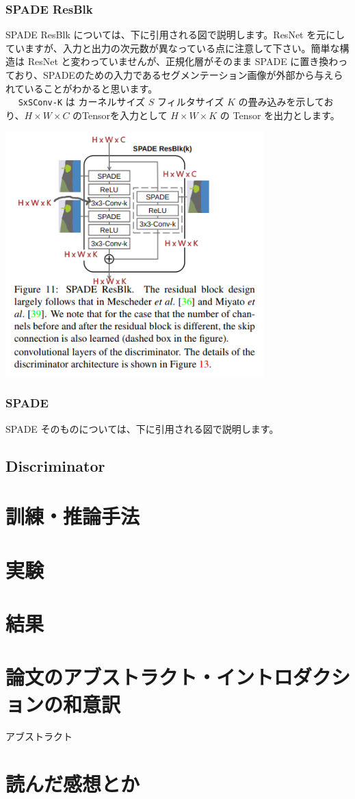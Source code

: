 \documentclass[a4paper, dvipdfmx, 10pt]{article}
\begin{document}
\subsubsection{SPADE ResBlk}
\label{sec:orgc088769}
SPADE ResBlk については、下に引用される図で説明します。ResNet を元にしていますが、入力と出力の次元数が異なっている点に注意して下さい。簡単な構造は ResNet と変わっていませんが、正規化層がそのまま SPADE に置き換わっており、SPADEのための入力であるセグメンテーション画像が外部から与えられていることがわかると思います。\\
 　 \texttt{SxSConv-K} は カーネルサイズ \(S\) フィルタサイズ \(K\) の畳み込みを示しており、\(H\times W\times C\) のTensorを入力として \(H \times W \times K\) の Tensor を出力とします。\\
\begin{center}
\includegraphics[width=10cm]{./SPADE_ResBlk.png}
\end{center}

\subsubsection{SPADE}
\label{sec:org10c3c81}
SPADE そのものについては、下に引用される図で説明します。\\



\subsection{Discriminator}
\label{sec:orgf4b0964}

\section{訓練・推論手法}
\label{sec:org5ab6e20}
\section{実験}
\label{sec:org22621a9}
\section{結果}
\label{sec:org6710ff8}
\section{論文のアブストラクト・イントロダクションの和意訳}
\label{sec:orgf676c62}
アブストラクト\\
\section{読んだ感想とか}
\label{sec:org3eed845}
\end{document}
